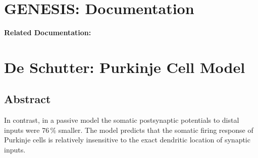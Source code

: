 \documentclass[12pt]{article}
\begin{document}
\section*{GENESIS: Documentation}

{\bf Related Documentation:}

\section*{De Schutter: Purkinje Cell Model}

\subsection*{Abstract}

In contrast, in a passive model the somatic postsynaptic potentials to distal inputs were 76\,\% smaller. The model predicts that the somatic firing response of Purkinje cells is relatively insensitive to the exact dendritic location of synaptic inputs.
\end{document}
